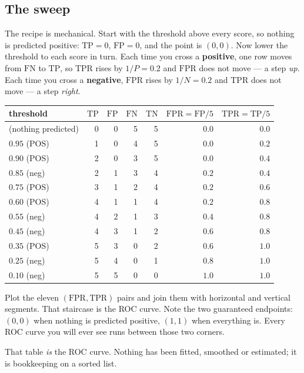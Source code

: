 \documentclass[11pt]{article}
\newcommand{\TP}{\mathrm{TP}}
\newcommand{\FP}{\mathrm{FP}}
\newcommand{\TN}{\mathrm{TN}}
\newcommand{\FN}{\mathrm{FN}}
\newcommand{\TPR}{\mathrm{TPR}}
\newcommand{\FPR}{\mathrm{FPR}}
\begin{document}
\subsection{The sweep}

The recipe is mechanical. Start with the threshold above every score, so nothing
is predicted positive: $\TP = 0$, $\FP = 0$, and the point is $(0,0)$. Now lower
the threshold to each score in turn. Each time you cross a \textbf{positive}, one
row moves from $\FN$ to $\TP$, so $\TPR$ rises by $1/P = 0.2$ and $\FPR$ does not
move --- a step \emph{up}. Each time you cross a \textbf{negative}, $\FPR$ rises
by $1/N = 0.2$ and $\TPR$ does not move --- a step \emph{right}.

\begin{worked}
\begin{center}\footnotesize
\begin{tabular}{@{}lrrrrrr@{}}
\toprule
threshold & $\TP$ & $\FP$ & $\FN$ & $\TN$ & $\FPR = \FP/5$ & $\TPR = \TP/5$\\
\midrule
(nothing predicted) & 0 & 0 & 5 & 5 & $0.0$ & $0.0$\\
$0.95$ \;(POS) & 1 & 0 & 4 & 5 & $0.0$ & $0.2$\\
$0.90$ \;(POS) & 2 & 0 & 3 & 5 & $0.0$ & $0.4$\\
$0.85$ \;(neg) & 2 & 1 & 3 & 4 & $0.2$ & $0.4$\\
$0.75$ \;(POS) & 3 & 1 & 2 & 4 & $0.2$ & $0.6$\\
$0.60$ \;(POS) & 4 & 1 & 1 & 4 & $0.2$ & $0.8$\\
$0.55$ \;(neg) & 4 & 2 & 1 & 3 & $0.4$ & $0.8$\\
$0.45$ \;(neg) & 4 & 3 & 1 & 2 & $0.6$ & $0.8$\\
$0.35$ \;(POS) & 5 & 3 & 0 & 2 & $0.6$ & $1.0$\\
$0.25$ \;(neg) & 5 & 4 & 0 & 1 & $0.8$ & $1.0$\\
$0.10$ \;(neg) & 5 & 5 & 0 & 0 & $1.0$ & $1.0$\\
\bottomrule
\end{tabular}
\end{center}
Plot the eleven $(\FPR, \TPR)$ pairs and join them with horizontal and vertical
segments. That staircase is the ROC curve. Note the two guaranteed endpoints:
$(0,0)$ when nothing is predicted positive, $(1,1)$ when everything is. Every
ROC curve you will ever see runs between those two corners.
\end{worked}

That table \emph{is} the ROC curve. Nothing has been fitted, smoothed or
estimated; it is bookkeeping on a sorted list.
\end{document}
